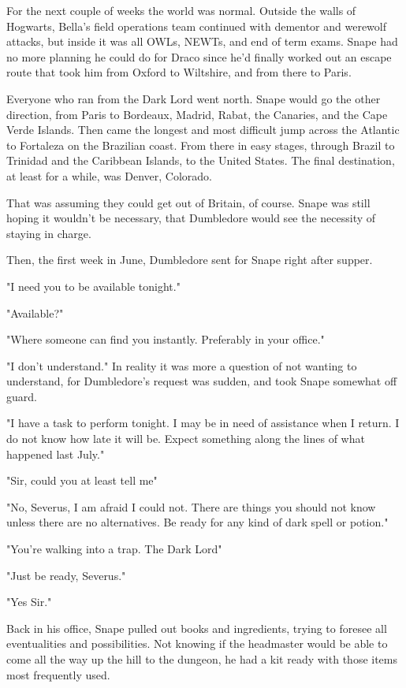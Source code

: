 For the next couple of weeks the world was normal. Outside the walls of Hogwarts, Bella's field operations team continued with dementor and werewolf attacks, but inside it was all OWLs, NEWTs, and end of term exams. Snape had no more planning he could do for Draco since he'd finally worked out an escape route that took him from Oxford to Wiltshire, and from there to Paris.

Everyone who ran from the Dark Lord went north. Snape would go the other direction, from Paris to Bordeaux, Madrid, Rabat, the Canaries, and the Cape Verde Islands. Then came the longest and most difficult jump across the Atlantic to Fortaleza on the Brazilian coast. From there in easy stages, through Brazil to Trinidad and the Caribbean Islands, to the United States. The final destination, at least for a while, was Denver, Colorado.

That was assuming they could get out of Britain, of course. Snape was still hoping it wouldn't be necessary, that Dumbledore would see the necessity of staying in charge.

Then, the first week in June, Dumbledore sent for Snape right after supper.

"I need you to be available tonight."

"Available?"

"Where someone can find you instantly. Preferably in your office."

"I don't understand." In reality it was more a question of not wanting to understand, for Dumbledore's request was sudden, and took Snape somewhat off guard.

"I have a task to perform tonight. I may be in need of assistance when I return. I do not know how late it will be. Expect something along the lines of what happened last July."

"Sir, could you at least tell me{\el}"

"No, Severus, I am afraid I could not. There are things you should not know unless there are no alternatives. Be ready for any kind of dark spell or potion."

"You're walking into a trap. The Dark Lord{\el}"

"Just be ready, Severus."

"Yes{\el} Sir."

Back in his office, Snape pulled out books and ingredients, trying to foresee all eventualities and possibilities. Not knowing if the headmaster would be able to come all the way up the hill to the dungeon, he had a kit ready with those items most frequently used.

